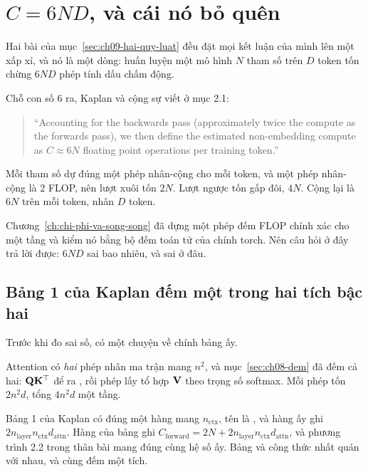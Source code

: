 \section{\texorpdfstring{\(C = 6ND\)}{C = 6ND}, và cái nó bỏ quên}
\label{sec:ch09-sau-nd}

%
Hai bài của mục~\ref{sec:ch09-hai-quy-luat} đều đặt mọi kết luận của mình lên
một xấp xỉ, và nó là một dòng: huấn luyện một mô hình \(N\) tham số trên \(D\)
token tốn chừng \(6ND\) phép tính dấu chấm động.

Chỗ con số 6 ra, Kaplan và cộng sự viết ở mục 2.1:

\begin{quote}
\enquote{Accounting for the backwards pass (approximately twice the compute as
the forwards pass), we then define the estimated non-embedding compute as
\(C \approx 6N\) floating point operations per training
token.}~\autocite{kaplan2020scaling}
\end{quote}

Mỗi tham số dự đúng một phép nhân-cộng cho mỗi token, và một phép nhân-cộng là
2 FLOP, nên lượt xuôi tốn \(2N\). Lượt ngược tốn gấp đôi, \(4N\). Cộng lại là
\(6N\) trên mỗi token, nhân \(D\) token.

Chương~\ref{ch:chi-phi-va-song-song} đã dựng một phép đếm FLOP chính xác cho
một tầng và kiểm nó bằng bộ đếm toán tử của chính torch. Nên câu hỏi ở đây trả
lời được: \(6ND\) sai bao nhiêu, và sai ở đâu.

\subsection*{Bảng 1 của Kaplan đếm một trong hai tích bậc hai}

%
Trước khi đo sai số, có một chuyện về chính bảng ấy.

Attention có \emph{hai} phép nhân ma trận mang \(n^2\), và
mục~\ref{sec:ch08-dem} đã đếm cả hai: \(\mathbf{Q}\mathbf{K}^\top\) để ra
, rồi phép lấy tổ hợp \(\mathbf{V}\) theo trọng
số softmax. Mỗi phép tốn
\(2n^2 d\), tổng \(4n^2 d\) một tầng.

Bảng 1 của Kaplan có đúng một hàng mang \(n_{\mathrm{ctx}}\), tên là
, và hàng ấy ghi \(2 n_{\mathrm{layer}}
n_{\mathrm{ctx}} d_{\mathrm{attn}}\). Hàng  của bảng ghi
\(C_{\mathrm{forward}} = 2N + 2 n_{\mathrm{layer}} n_{\mathrm{ctx}}
d_{\mathrm{attn}}\), và phương trình 2.2 trong thân bài mang đúng cùng hệ số
ấy. Bảng và công thức nhất quán với nhau, và cùng đếm một tích.

